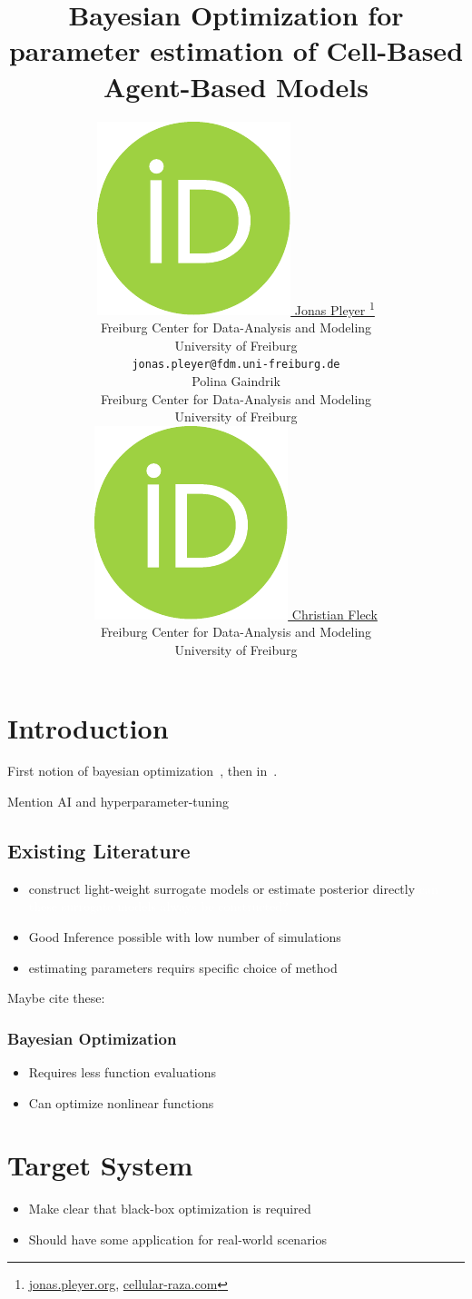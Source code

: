 \documentclass{article}
\title{Bayesian Optimization for parameter estimation of Cell-Based Agent-Based Models}
\author{
    \href{https://orcid.org/0009-0001-0613-7978}{
        \includegraphics[scale=0.06]{orcid.pdf}
        \hspace{1mm}Jonas Pleyer
    }
    \thanks{
        \href{https://jonas.pleyer.org}{jonas.pleyer.org},
        \href{https://cellular-raza.com}{cellular-raza.com}
    }\\
	Freiburg Center for Data-Analysis and Modeling\\
	University of Freiburg\\
	\texttt{jonas.pleyer@fdm.uni-freiburg.de} \\
	\And
    Polina Gaindrik\\
	Freiburg Center for Data-Analysis and Modeling\\
	University of Freiburg\\
	\And
	\href{https://orcid.org/0000-0002-6371-4495}{
        \includegraphics[scale=0.06]{orcid.pdf}
        \hspace{1mm}Christian Fleck
    }\\
	Freiburg Center for Data-Analysis and Modeling\\
	University of Freiburg
}
\newcommand{\todo}[1]{\colorbox{WildStrawberry}{\textcolor{white}{#1}}}
\begin{document}
\maketitle

\begin{abstract}
\end{abstract}



\section{Introduction}
\label{section:introduction}
First notion of bayesian optimization~\cite{Kushner1964}, then in~\cite{Mockus1978}.

Mention AI and hyperparameter-tuning

\subsection*{Existing Literature}
\cite{Jrgensen2022}
\begin{itemize}
    \item construct light-weight surrogate models or estimate posterior directly
        \todo{can these surrogate models always be constructed?}
    \item Good Inference possible with low number of simulations
    \item estimating parameters requirs specific choice of method
\end{itemize}

Maybe cite these:
\cite{Lima2021,Duswald2024}

\subsubsection*{Bayesian Optimization}
\begin{itemize}
    \item Requires less function evaluations
    \item Can optimize nonlinear functions
\end{itemize}

\section{Target System}
\label{section:target-system}
\begin{itemize}
    \item Make clear that black-box optimization is required
    \item Should have some application for real-world scenarios
\end{itemize}
\end{document}
